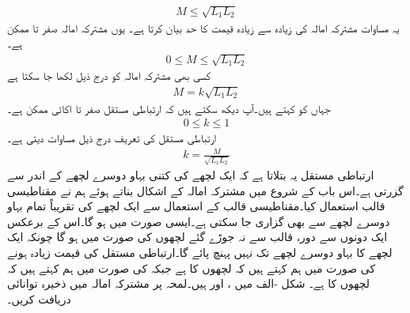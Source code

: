 \begin{align}
M\le \sqrt{L_1 L_2}
\end{align}
یہ مساوات مشترکہ امالہ کی زیادہ سے زیادہ قیمت کا حد بیان کرتا ہے۔  یوں مشترکہ امالہ صفر تا  ممکن ہے۔
\begin{align}
0\le M \le \sqrt{L_1 L_2}
\end{align}
 کسی بھی مشترکہ امالہ کو درج ذیل لکھا جا سکتا ہے
\begin{align}\label{مساوات_مقناطیسی_مشترک_امالہ_تعریف_الف}
M=k\sqrt{L_1 L_2}
\end{align}
جہاں  کو  کہتے ہیں۔آپ دیکھ سکتے ہیں کہ ارتباطی مستقل صفر تا اکائی ممکن ہے۔
\begin{align}
0 \le k \le 1
\end{align}
ارتباطی مستقل کی تعریف درج ذیل مساوات دیتی ہے۔
\begin{align}
k=\frac{M}{\sqrt{L_1 L_2}}
\end{align}
ارتباطی مستقل یہ بتلاتا ہے کہ ایک لچھے کی کتنی بہاو دوسرے لچھے کے اندر سے گزرتی ہے۔اس باب کے شروع میں مشترکہ امالہ کے اشکال بناتے ہوئے ہم نے مقناطیسی قالب استعمال کیا۔مقناطیسی قالب کے استعمال سے ایک لچھے کی تقریباً تمام بہاو دوسرے لچھے سے بھی گزاری جا سکتی ہے۔ایسی صورت میں  ہو گا۔اس کے برعکس ایک دونوں سے دور، قالب سے نہ جوڑے گئے لچھوں کی صورت میں  ہو گا چونکہ ایک لچھے کا بہاو دوسرے لچھے تک نہیں پہنچ پائے گا۔ارتباطی مستقل کی قیمت زیادہ  ہونے کی صورت میں ہم کہتے ہیں کہ لچھوں کا  ہے جبکہ  کی صورت میں ہم کہتے ہیں کہ لچھوں کا  ہے۔    
شکل -الف میں ،  اور  ہیں۔لمحہ  پر مشترکہ امالہ میں ذخیرہ توانائی دریافت کریں۔
